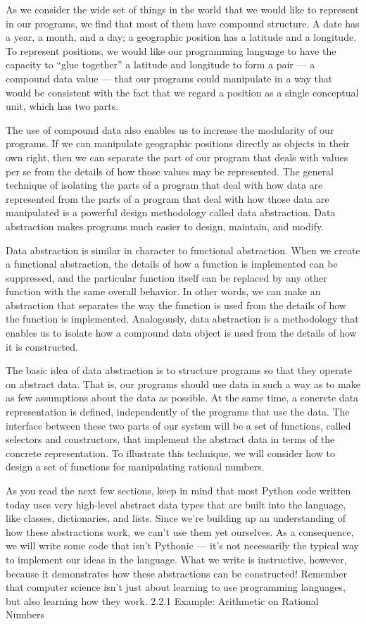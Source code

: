 \documentclass[letterpaper,10pt,dvipdfmx]{sphinxmanual}
\begin{document}
As we consider the wide set of things in the world that we would like to represent in our programs, we find that most of them have compound structure. A date has a year, a month, and a day; a geographic position has a latitude and a longitude. To represent positions, we would like our programming language to have the capacity to ``glue together'' a latitude and longitude to form a pair --- a compound data value --- that our programs could manipulate in a way that would be consistent with the fact that we regard a position as a single conceptual unit, which has two parts.

The use of compound data also enables us to increase the modularity of our programs. If we can manipulate geographic positions directly as objects in their own right, then we can separate the part of our program that deals with values per se from the details of how those values may be represented. The general technique of isolating the parts of a program that deal with how data are represented from the parts of a program that deal with how those data are manipulated is a powerful design methodology called data abstraction. Data abstraction makes programs much easier to design, maintain, and modify.

Data abstraction is similar in character to functional abstraction. When we create a functional abstraction, the details of how a function is implemented can be suppressed, and the particular function itself can be replaced by any other function with the same overall behavior. In other words, we can make an abstraction that separates the way the function is used from the details of how the function is implemented. Analogously, data abstraction is a methodology that enables us to isolate how a compound data object is used from the details of how it is constructed.

The basic idea of data abstraction is to structure programs so that they operate on abstract data. That is, our programs should use data in such a way as to make as few assumptions about the data as possible. At the same time, a concrete data representation is defined, independently of the programs that use the data. The interface between these two parts of our system will be a set of functions, called selectors and constructors, that implement the abstract data in terms of the concrete representation. To illustrate this technique, we will consider how to design a set of functions for manipulating rational numbers.

As you read the next few sections, keep in mind that most Python code written today uses very high-level abstract data types that are built into the language, like classes, dictionaries, and lists. Since we're building up an understanding of how these abstractions work, we can't use them yet ourselves. As a consequence, we will write some code that isn't Pythonic --- it's not necessarily the typical way to implement our ideas in the language. What we write is instructive, however, because it demonstrates how these abstractions can be constructed! Remember that computer science isn't just about learning to use programming languages, but also learning how they work.
2.2.1   Example: Arithmetic on Rational Numbers
\end{document}
